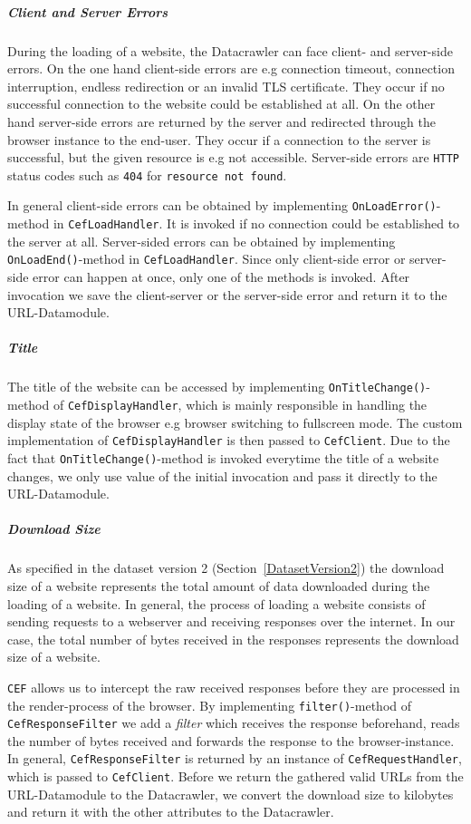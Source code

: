 \subparagraph*{Client and Server Errors}
During the loading of a website, the Datacrawler can face client- and server-side errors. On the one hand client-side errors are e.g connection timeout, connection interruption, endless redirection or an invalid TLS certificate. They occur if no successful connection to the website could be established at all. On the other hand server-side errors are returned by the server and redirected through the browser instance to the end-user. They occur if a connection to the server is successful, but the given resource is e.g not accessible. Server-side errors are \texttt{HTTP} status codes such as \texttt{404} for \texttt{resource not found}. 

In general client-side errors can be obtained by implementing \texttt{OnLoadError()}-method in \texttt{CefLoadHandler}. It is invoked if no connection could be established to the server at all. Server-sided errors can be obtained by implementing \texttt{OnLoadEnd()}-method in \texttt{CefLoadHandler}. Since only client-side error or server-side error can happen at once, only one of the methods is invoked. After invocation we save the client-server or the server-side error and return it to the URL-Datamodule.

\subparagraph*{Title}
The title of the website can be accessed by implementing \texttt{OnTitleChange()}-method of \texttt{CefDisplayHandler}, which is mainly responsible in handling the display state of the browser e.g browser switching to fullscreen mode. The custom implementation of \texttt{CefDisplayHandler} is then passed to \texttt{CefClient}. Due to the fact that \texttt{OnTitleChange()}-method is invoked everytime the title of a website changes, we only use value of the initial invocation and pass it directly to the URL-Datamodule.

\subparagraph*{Download Size}
As specified in the dataset version 2 (Section~\ref{DatasetVersion2}) the download size of a website represents the total amount of data downloaded during the loading of a website. In general, the process of loading a website consists of sending requests to a webserver and receiving responses over the internet. In our case, the total number of bytes received in the responses represents the download size of a website.

\texttt{CEF} allows us to intercept the raw received responses before they are processed in the render-process of the browser. By implementing \texttt{filter()}-method of \texttt{CefResponseFilter} we add a \textit{filter} which receives the response beforehand, reads the number of bytes received and forwards the response to the browser-instance. In general, \texttt{CefResponseFilter} is returned by an instance of \texttt{CefRequestHandler}, which is passed to \texttt{CefClient}. Before we return the gathered valid URLs from the URL-Datamodule to the Datacrawler, we convert the download size to kilobytes and return it with the other attributes to the Datacrawler.

